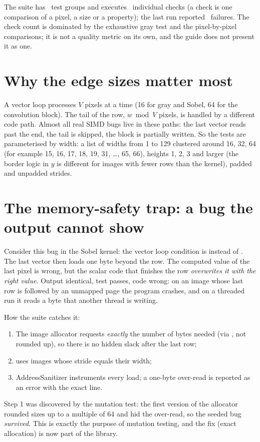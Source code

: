 The suite has \testGroups\ test groups and executes \testChecks\ individual checks (a check is one comparison of a pixel, a size or a property); the last run reported \testFailures\ failures. The check count is dominated by the exhaustive gray test and the pixel-by-pixel comparisons; it is not a quality metric on its own, and the guide does not present it as one.

\section{Why the edge sizes matter most}

A vector loop processes $V$ pixels at a time (16 for gray and Sobel, 64 for the convolution block). The tail of the row, $w \bmod V$ pixels, is handled by a different code path. Almost all real SIMD bugs live in these paths: the last vector reads past the end, the tail is skipped, the block is partially written. So the tests are parameterised by width: a list of widths from 1 to 129 clustered around 16, 32, 64 (for example 15, 16, 17, 18, 19, 31, \dots, 65, 66), heights 1, 2, 3 and larger (the border logic in $y$ is different for images with fewer rows than the kernel), padded and unpadded strides.

\section{The memory-safety trap: a bug the output cannot show}

Consider this bug in the Sobel kernel: the vector loop condition is  instead of . The last vector then loads one byte beyond the row. The computed value of the last pixel is wrong, but the scalar code that finishes the row \emph{overwrites it with the right value}. Output identical, test passes, code wrong: on an image whose last row is followed by an unmapped page the program crashes, and on a threaded run it reads a byte that another thread is writing.

How the suite catches it:
\begin{enumerate}
\item The image allocator requests \emph{exactly} the number of bytes needed (via , not rounded up), so there is no hidden slack after the last row;
\item {} uses images whose stride equals their width;
\item AddressSanitizer instruments every load; a one-byte over-read is reported as an error with the exact line.
\end{enumerate}
Step 1 was discovered by the mutation test: the first version of the allocator rounded sizes up to a multiple of 64 and hid the over-read, so the seeded bug \emph{survived}. This is exactly the purpose of mutation testing, and the fix (exact allocation) is now part of the library.

